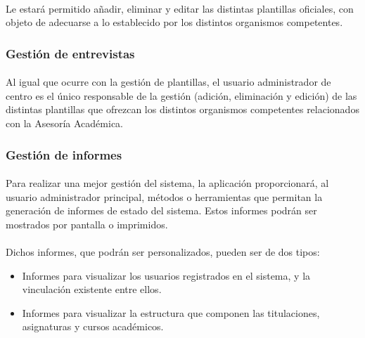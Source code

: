       \paragraph{}Le estará permitido añadir, eliminar y editar las distintas
      plantillas oficiales, con objeto de adecuarse a lo establecido por los
      distintos organismos competentes.

      \subsubsection{Gestión de entrevistas}

      \paragraph{}Al igual que ocurre con la gestión de plantillas, el usuario
      administrador de centro es el único responsable de la gestión (adición,
      eliminación y edición) de las distintas plantillas que ofrezcan los
      distintos organismos competentes relacionados con la Asesoría Académica.

      \subsubsection{Gestión de informes}

      \paragraph{}Para realizar una mejor gestión del sistema, la aplicación
      proporcionará, al usuario administrador principal, métodos o herramientas
      que permitan la generación de informes de estado del sistema. Estos
      informes podrán ser mostrados por pantalla o imprimidos.

      \paragraph{}Dichos informes, que podrán ser personalizados, pueden ser
      de dos tipos:

      \begin{itemize}
       \item Informes para visualizar los usuarios registrados en el sistema, y
             la vinculación existente entre ellos.
       \item Informes para visualizar la estructura que componen las
             titulaciones, asignaturas y cursos académicos.
      \end{itemize}

